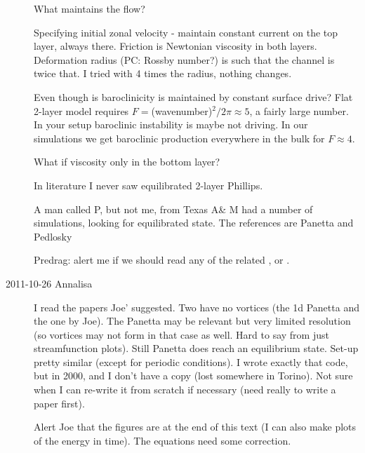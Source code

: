\begin{description}
 What maintains the flow?

 Specifying initial zonal velocity - maintain constant current on the top layer,
always there. Friction is Newtonian viscosity in both layers. Deformation
radius (PC: Rossby number?) is such that the channel is twice that. I tried
with 4 times the radius, nothing changes.

 Even though is baroclinicity is maintained by constant surface
drive? Flat 2-layer model requires $F = $(wavenumber)$^2/2\pi \approx 5$,
a fairly large number. In your setup baroclinic instability is maybe not
driving. In our simulations we get baroclinic
production everywhere in the bulk for $F \approx 4$.

What if viscosity only in the bottom layer?

 In literature I never saw equilibrated 2-layer Phillips.

 A man called P, but not me, from Texas A\& M had a number of
simulations, looking for equilibrated state. The references are
Panetta and Pedlosky

Predrag: alert me if we should read any of the related
, or
.

\item[2011-10-26 Annalisa]
I read the papers Joe' suggested. Two have no vortices (the 1d
Panetta and the one by Joe). The
Panetta may be relevant but very limited resolution (so
vortices may not form in that case as well. Hard to say from just
streamfunction plots). Still Panetta does reach an equilibrium state.
Set-up pretty similar (except for periodic conditions). I wrote exactly
that code, but in 2000, and I don't have a copy (lost somewhere in
Torino). Not sure when I can re-write it from scratch if necessary (need
really to write a paper first).

Alert Joe that the figures are at the end of this text
(I can also make plots of the energy in time). The equations need some correction.

\end{description}
